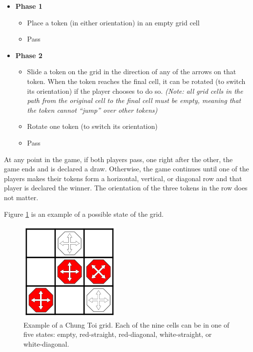 \documentclass[11pt,a4paper]{report}
\begin{document}
\begin{itemize}

	\item \textbf{Phase 1}
		\begin{itemize}
			\item Place a token (in either orientation) in an empty grid cell
			\item Pass
		\end{itemize}

	\item \textbf{Phase 2}
		\begin{itemize}
			\item Slide a token on the grid in the direction of any of the arrows on that token. When the token reaches the final cell, it can be rotated (to switch its orientation) if the player chooses to do so. \emph{(Note: all grid cells in the path from the original cell to the final cell must be empty, meaning that the token cannot ``jump'' over other tokens)}
			\item Rotate one token (to switch its orientation)
			\item Pass
		\end{itemize}

\end{itemize}

At any point in the game, if both players pass, one right after the other, the game ends and is declared a draw. Otherwise, the game continues until one of the players makes their tokens form a horizontal, vertical, or diagonal row and that player is declared the winner. The orientation of the three tokens in the row does not matter.

Figure \ref{chung-toi-grid-example} is an example of a possible state of the grid.

\begin{figure}[htbp]
	\begin{center}
		\includegraphics[width=50mm]{chung_toi_grid_example.png}
		\caption{Example of a Chung Toi grid. Each of the nine cells can be in one of five states: empty, red-straight, red-diagonal, white-straight, or white-diagonal.}
		\label{chung-toi-grid-example}
	\end{center}
\end{figure}
\end{document}
